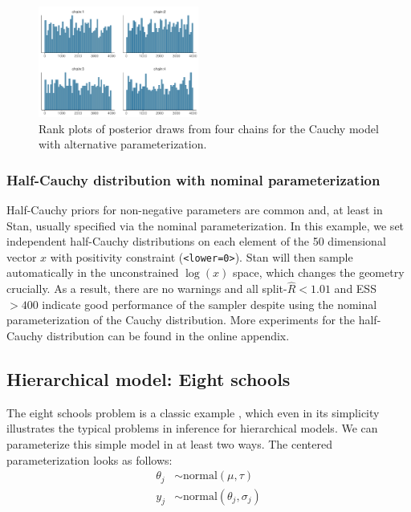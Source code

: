 \documentclass[american,]{article}
\theoremstyle{definition}
\begin{document}
\begin{figure}[tp]
  \centering
  \includegraphics[width=0.47\textwidth]{graphics/hist-fit-alt1-1.pdf}
  \caption{Rank plots of posterior draws from four chains for the Cauchy model with alternative parameterization.}
  \label{fig:hist-fit-alt1-1}
\end{figure}

\hypertarget{half-cauchy-distribution-with-nominal-parameterization}{%
\subsubsection*{Half-Cauchy distribution with nominal
parameterization}\label{half-cauchy-distribution-with-nominal-parameterization}}

Half-Cauchy priors for non-negative parameters are common and, at least in Stan, 
usually specified via the nominal parameterization.
In this example, we set independent half-Cauchy distributions on each element
of the 50 dimensional vector $x$ with positivity constraint
(\texttt{\textless{}lower=0\textgreater{}}). Stan will then
sample automatically in the unconstrained \(\log(x)\) space, which
changes the geometry crucially. As a result, there are no warnings and all
split-\(\widehat{R}<1.01\) and ESS \(>400\) indicate good
performance of the sampler despite using the nominal parameterization of
the Cauchy distribution. More experiments for the half-Cauchy distribution 
can be found in the online appendix.




\hypertarget{eightschools}{%
\subsection{Hierarchical model: Eight schools}\label{eightschools}}

The eight schools problem is a classic example
\citep[see Section 5.5 in][]{BDA3}, which even in its
simplicity illustrates the typical problems in inference for
hierarchical models. We can parameterize this simple model
in at least two ways. The centered parameterization looks as follows:
\begin{align*}
\theta_j &\sim \text{normal}(\mu, \tau) \\
y_j &\sim \text{normal}(\theta_j, \sigma_j)
\end{align*}
\end{document}
